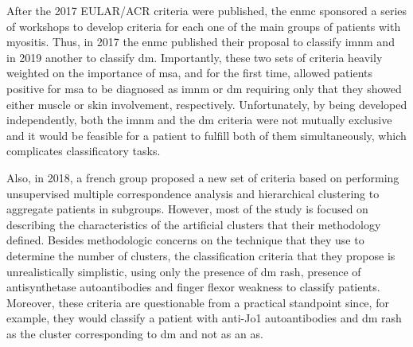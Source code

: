 After the 2017 EULAR/ACR criteria were published, the \gls{enmc} sponsored a series of workshops to develop criteria for each one of the main groups of patients with myositis. Thus, in 2017 the \gls{enmc} published their proposal to classify \gls{imnm}\cite{Allenbach2017} and in 2019 another to classify \gls{dm}.\cite{Mammen2020} Importantly, these two sets of criteria heavily weighted on the importance of \gls{msa}, and for the first time, allowed patients positive for \gls{msa} to be diagnosed as \gls{imnm} or \gls{dm} requiring only that they showed either muscle or skin involvement, respectively. Unfortunately, by being developed independently, both the \gls{imnm} and the \gls{dm} criteria were not mutually exclusive and it would be feasible for a patient to fulfill both of them simultaneously, which complicates classificatory tasks.

Also, in 2018, a french group proposed a new set of criteria based on performing unsupervised multiple correspondence analysis and hierarchical clustering to aggregate patients in subgroups.\cite{Mariampillai2018} However, most of the study is focused on describing the characteristics of the artificial clusters that their methodology defined. Besides methodologic concerns on the technique that they use to determine the number of clusters,\cite{PinalFernandez2019} the classification criteria that they propose is unrealistically simplistic, using only the presence of \gls{dm} rash, presence of antisynthetase autoantibodies and finger flexor weakness to classify patients. Moreover, these criteria are questionable from a practical standpoint since, for example, they would classify a patient with anti-Jo1 autoantibodies and \gls{dm} rash as the cluster corresponding to \gls{dm} and not as an \gls{as}.

